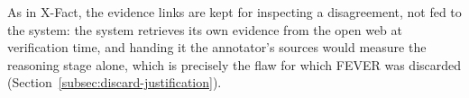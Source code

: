As in X-Fact, the evidence links are kept for inspecting a
disagreement, not fed to the system: the system retrieves its own
evidence from the open web at verification time, and handing it the
annotator's sources would measure the reasoning stage alone, which is
precisely the flaw for which FEVER was discarded
(Section~\ref{subsec:discard-justification}).
